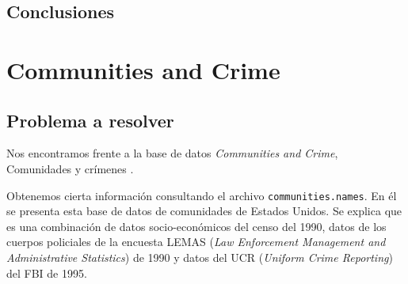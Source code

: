 \documentclass[a4paper, 20pt]{article}
\begin{document}
\subsection{Conclusiones}
\newpage


\section{Communities and Crime}

\subsection{Problema a resolver}

Nos encontramos frente a la base de datos \textit{Communities and Crime}, Comunidades y crímenes \cite{com_uci}.

Obtenemos cierta información consultando el archivo \texttt{communities.names}. En él se presenta esta base de datos de comunidades de Estados Unidos. Se explica que es una combinación de datos socio-económicos del censo del 1990, datos de los cuerpos policiales de la encuesta LEMAS (\textit{Law Enforcement Management and Administrative Statistics}) de 1990 y datos del UCR (\textit{Uniform Crime Reporting}) del FBI de 1995.
\end{document}
